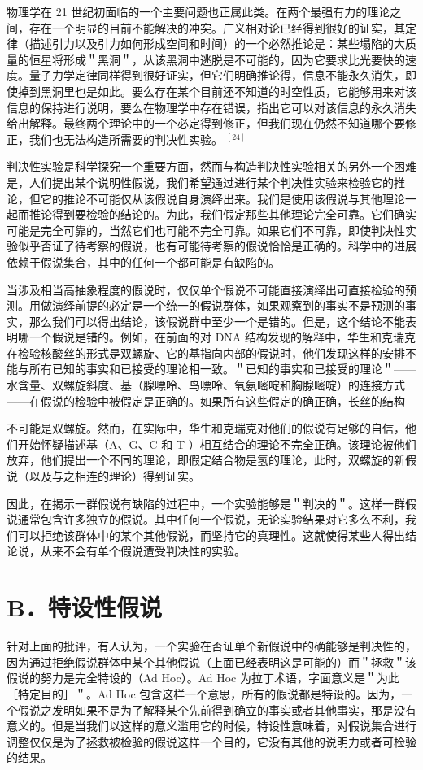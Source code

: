 物理学在 21 世纪初面临的一个主要问题也正属此类。在两个最强有力的理论之间，存在一个明显的目前不能解决的冲突。广义相对论已经得到很好的证实，其定律（描述引力以及引力如何形成空间和时间）的一个必然推论是：某些塌陷的大质量的恒星将形成＂黑洞＂，从该黑洞中逃脱是不可能的，因为它要求比光要快的速度。量子力学定律同样得到很好证实，但它们明确推论得，信息不能永久消失，即使掉到黑洞里也是如此。要么存在某个目前还不知道的时空性质，它能够用来对该信息的保持进行说明，要么在物理学中存在错误，指出它可以对该信息的永久消失给出解释。最终两个理论中的一个必定得到修正，但我们现在仍然不知道哪个要修正，我们也无法构造所需要的判决性实验。 ${ }^{[24]}$

判决性实验是科学探究一个重要方面，然而与构造判决性实验相关的另外一个困难是，人们提出某个说明性假说，我们希望通过进行某个判决性实验来检验它的推论，但它的推论不可能仅从该假说自身演绎出来。我们是使用该假说与其他理论一起而推论得到要检验的结论的。为此，我们假定那些其他理论完全可靠。它们确实可能是完全可靠的，当然它们也可能不完全可靠。如果它们不可靠，即使判决性实验似乎否证了待考察的假说，也有可能待考察的假说恰恰是正确的。科学中的进展依赖于假说集合，其中的任何一个都可能是有缺陷的。

当涉及相当高抽象程度的假说时，仅仅单个假说不可能直接演绎出可直接检验的预测。用做演绎前提的必定是一个统一的假说群体，如果观察到的事实不是预测的事实，那么我们可以得出结论，该假说群中至少一个是错的。但是，这个结论不能表明哪一个假说是错的。例如，在前面的对 DNA 结构发现的解释中，华生和克瑞克在检验核酸丝的形式是双螺旋、它的基指向内部的假说时，他们发现这样的安排不能与所有已知的事实和已接受的理论相一致。＂已知的事实和已接受的理论＂——水含量、双螺旋斜度、基（腺嘌呤、鸟嘌呤、氧氨嘧啶和胸腺嘧啶）的连接方式——在假说的检验中被假定是正确的。如果所有这些假定的确正确，长丝的结构

不可能是双螺旋。然而，在实际中，华生和克瑞克对他们的假说有足够的自信，他们开始怀疑描述基（A、G、C 和 T ）相互结合的理论不完全正确。该理论被他们放弃，他们提出一个不同的理论，即假定结合物是氢的理论，此时，双螺旋的新假说（以及与之相连的理论）得到证实。

因此，在揭示一群假说有缺陷的过程中，一个实验能够是＂判决的＂。这样一群假说通常包含许多独立的假说。其中任何一个假说，无论实验结果对它多么不利，我们可以拒绝该群体中的某个其他假说，而坚持它的真理性。这就使得某些人得出结论说，从来不会有单个假说遭受判决性的实验。

\section*{B．特设性假说}
针对上面的批评，有人认为，一个实验在否证单个新假说中的确能够是判决性的，因为通过拒绝假说群体中某个其他假说（上面已经表明这是可能的）而＂拯救＂该假说的努力是完全特设的（Ad Hoc）。Ad Hoc 为拉丁术语，字面意义是＂为此［特定目的］＂。Ad Hoc 包含这样一个意思，所有的假说都是特设的。因为，一个假说之发明如果不是为了解释某个先前得到确立的事实或者其他事实，那是没有意义的。但是当我们以这样的意义滥用它的时候，特设性意味着，对假说集合进行调整仅仅是为了拯救被检验的假说这样一个目的，它没有其他的说明力或者可检验的结果。


